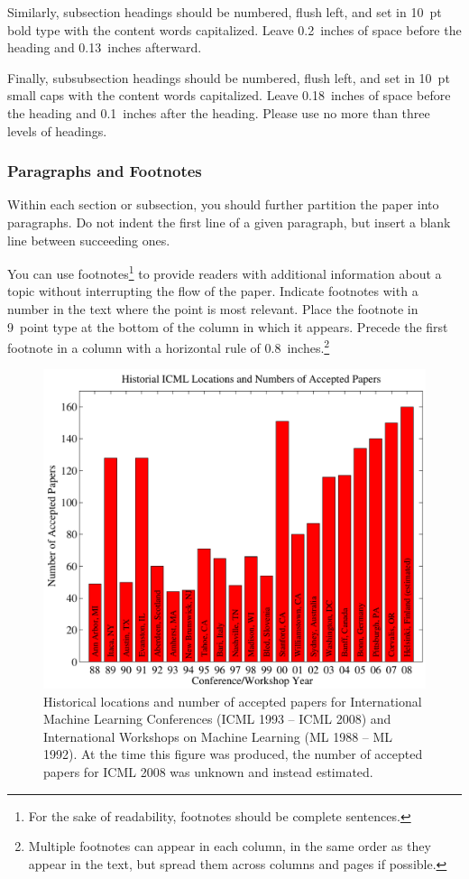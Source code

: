 \documentclass{article}
\begin{document}
Similarly, subsection headings should be numbered, flush left, and set in 10~pt bold type with the content words capitalized. Leave 0.2~inches of space before the heading and 0.13~inches afterward.

Finally, subsubsection headings should be numbered, flush left, and set in 10~pt small caps with the content words capitalized. Leave 0.18~inches of space before the heading and 0.1~inches after the heading. Please use no more than three levels of headings.

\subsubsection{Paragraphs and Footnotes}

Within each section or subsection, you should further partition the paper into paragraphs. Do not indent the first line of a given paragraph, but insert a blank line between succeeding ones.

You can use footnotes\footnote{For the sake of readability, footnotes should be complete sentences.} to provide readers with additional information about a topic without interrupting the flow of the paper. Indicate footnotes with a number in the text where the point is most relevant. Place the footnote in 9~point type at the bottom of the column in which it appears. Precede the first footnote in a column with a horizontal rule of 0.8~inches.\footnote{Multiple footnotes can appear in each column, in the same order as they appear in the text, but spread them across columns and pages if possible.}

\begin{figure}[ht]
\vskip 0.2in
\begin{center}
\centerline{\includegraphics[width=\columnwidth]{icml_numpapers}}
\caption{Historical locations and number of accepted papers for International
  Machine Learning Conferences (ICML 1993 -- ICML 2008) and
  International Workshops on Machine Learning (ML 1988 -- ML
  1992). At the time this figure was produced, the number of
  accepted papers for ICML 2008 was unknown and instead estimated.}
\label{icml-historical}
\end{center}
\vskip -0.2in
\end{figure}
\end{document}
